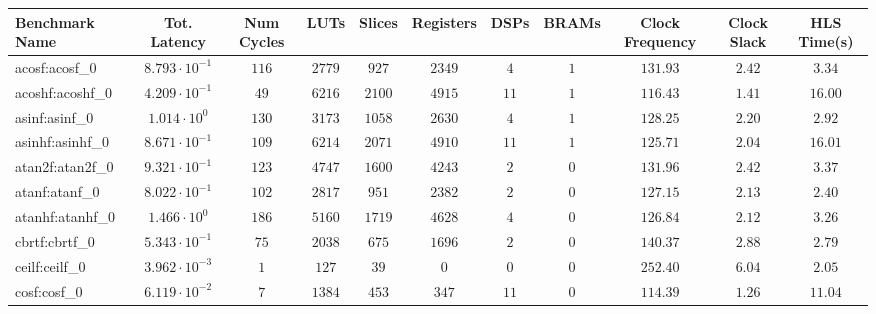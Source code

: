 \begin{tabular}{|l|c|c|c|c|c|c|c|c|c|c|}
\hline
Benchmark Name               & Tot. Latency            & Num Cycles & LUTs       & Slices    & Registers & DSPs    & BRAMs & Clock Frequency & Clock Slack & HLS Time(s) \\
\hline
acosf:acosf\_0               & $ 8.793 \cdot 10^{-1} $ & $ 116    $ & $ 2779   $ & $ 927   $ & $ 2349  $ & $ 4   $ & $ 1 $ & $ 131.93      $ & $ 2.42    $ & $ 3.34    $ \\
acoshf:acoshf\_0             & $ 4.209 \cdot 10^{-1} $ & $ 49     $ & $ 6216   $ & $ 2100  $ & $ 4915  $ & $ 11  $ & $ 1 $ & $ 116.43      $ & $ 1.41    $ & $ 16.00   $ \\
asinf:asinf\_0               & $ 1.014 \cdot 10^{0}  $ & $ 130    $ & $ 3173   $ & $ 1058  $ & $ 2630  $ & $ 4   $ & $ 1 $ & $ 128.25      $ & $ 2.20    $ & $ 2.92    $ \\
asinhf:asinhf\_0             & $ 8.671 \cdot 10^{-1} $ & $ 109    $ & $ 6214   $ & $ 2071  $ & $ 4910  $ & $ 11  $ & $ 1 $ & $ 125.71      $ & $ 2.04    $ & $ 16.01   $ \\
atan2f:atan2f\_0             & $ 9.321 \cdot 10^{-1} $ & $ 123    $ & $ 4747   $ & $ 1600  $ & $ 4243  $ & $ 2   $ & $ 0 $ & $ 131.96      $ & $ 2.42    $ & $ 3.37    $ \\
atanf:atanf\_0               & $ 8.022 \cdot 10^{-1} $ & $ 102    $ & $ 2817   $ & $ 951   $ & $ 2382  $ & $ 2   $ & $ 0 $ & $ 127.15      $ & $ 2.13    $ & $ 2.40    $ \\
atanhf:atanhf\_0             & $ 1.466 \cdot 10^{0}  $ & $ 186    $ & $ 5160   $ & $ 1719  $ & $ 4628  $ & $ 4   $ & $ 0 $ & $ 126.84      $ & $ 2.12    $ & $ 3.26    $ \\
cbrtf:cbrtf\_0               & $ 5.343 \cdot 10^{-1} $ & $ 75     $ & $ 2038   $ & $ 675   $ & $ 1696  $ & $ 2   $ & $ 0 $ & $ 140.37      $ & $ 2.88    $ & $ 2.79    $ \\
ceilf:ceilf\_0               & $ 3.962 \cdot 10^{-3} $ & $ 1      $ & $ 127    $ & $ 39    $ & $ 0     $ & $ 0   $ & $ 0 $ & $ 252.40      $ & $ 6.04    $ & $ 2.05    $ \\
cosf:cosf\_0                 & $ 6.119 \cdot 10^{-2} $ & $ 7      $ & $ 1384   $ & $ 453   $ & $ 347   $ & $ 11  $ & $ 0 $ & $ 114.39      $ & $ 1.26    $ & $ 11.04   $ \\

\end{tabular}
